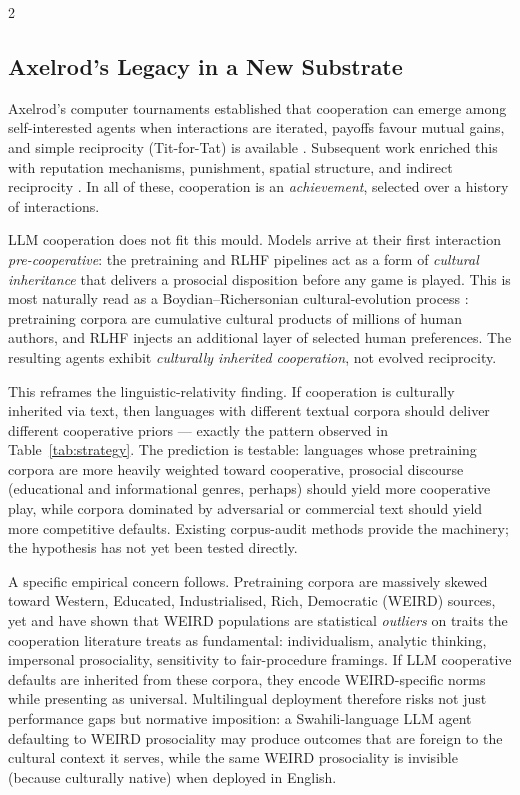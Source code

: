 \documentclass[openacc]{rsproca_new}
\begin{document}
\begin{multicols}{2}
\subsection{Axelrod's Legacy in a New Substrate}

Axelrod's computer tournaments established that cooperation can emerge among self-interested agents when interactions are iterated, payoffs favour mutual gains, and simple reciprocity (Tit-for-Tat) is available \cite{axelrod1984evolution, nowak2006five}. Subsequent work enriched this with reputation mechanisms, punishment, spatial structure, and indirect reciprocity \cite{nowak1998evolution, panchanathan2004indirect}. In all of these, cooperation is an \emph{achievement}, selected over a history of interactions.

LLM cooperation does not fit this mould. Models arrive at their first interaction \emph{pre-cooperative}: the pretraining and RLHF pipelines act as a form of \emph{cultural inheritance} that delivers a prosocial disposition before any game is played. This is most naturally read as a Boydian--Richersonian cultural-evolution process \cite{boyd1985culture, richerson2005notbygenes, henrich2016secret}: pretraining corpora are cumulative cultural products of millions of human authors, and RLHF injects an additional layer of selected human preferences. The resulting agents exhibit \emph{culturally inherited cooperation}, not evolved reciprocity.

This reframes the linguistic-relativity finding. If cooperation is culturally inherited via text, then languages with different textual corpora should deliver different cooperative priors --- exactly the pattern observed in Table~\ref{tab:strategy}. The prediction is testable: languages whose pretraining corpora are more heavily weighted toward cooperative, prosocial discourse (educational and informational genres, perhaps) should yield more cooperative play, while corpora dominated by adversarial or commercial text should yield more competitive defaults. Existing corpus-audit methods \cite{gao2020pile, luccioni2021what} provide the machinery; the hypothesis has not yet been tested directly.

A specific empirical concern follows. Pretraining corpora are massively skewed toward Western, Educated, Industrialised, Rich, Democratic (WEIRD) sources, yet \citeauthor{henrich2010weirdest} \cite{henrich2010weirdest} and \citeauthor{muthukrishna2020beyondweird} \cite{muthukrishna2020beyondweird} have shown that WEIRD populations are statistical \emph{outliers} on traits the cooperation literature treats as fundamental: individualism, analytic thinking, impersonal prosociality, sensitivity to fair-procedure framings. If LLM cooperative defaults are inherited from these corpora, they encode WEIRD-specific norms while presenting as universal. Multilingual deployment therefore risks not just performance gaps but normative imposition: a Swahili-language LLM agent defaulting to WEIRD prosociality may produce outcomes that are foreign to the cultural context it serves, while the same WEIRD prosociality is invisible (because culturally native) when deployed in English.


\end{multicols}
\end{document}
